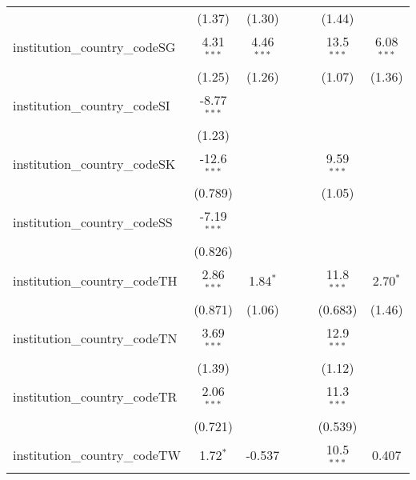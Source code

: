\begin{tabular}{lcccccc}
                                         & (1.37)         & (1.30)        &               &            & (1.44)        &   \\   
   institution\_country\_codeSG          & 4.31$^{***}$   & 4.46$^{***}$  &               &            & 13.5$^{***}$  & 6.08$^{***}$\\   
                                         & (1.25)         & (1.26)        &               &            & (1.07)        & (1.36)\\   
   institution\_country\_codeSI          & -8.77$^{***}$  &               &               &            &               &   \\   
                                         & (1.23)         &               &               &            &               &   \\   
   institution\_country\_codeSK          & -12.6$^{***}$  &               &               &            & 9.59$^{***}$  &   \\   
                                         & (0.789)        &               &               &            & (1.05)        &   \\   
   institution\_country\_codeSS          & -7.19$^{***}$  &               &               &            &               &   \\   
                                         & (0.826)        &               &               &            &               &   \\   
   institution\_country\_codeTH          & 2.86$^{***}$   & 1.84$^{*}$    &               &            & 11.8$^{***}$  & 2.70$^{*}$\\   
                                         & (0.871)        & (1.06)        &               &            & (0.683)       & (1.46)\\   
   institution\_country\_codeTN          & 3.69$^{***}$   &               &               &            & 12.9$^{***}$  &   \\   
                                         & (1.39)         &               &               &            & (1.12)        &   \\   
   institution\_country\_codeTR          & 2.06$^{***}$   &               &               &            & 11.3$^{***}$  &   \\   
                                         & (0.721)        &               &               &            & (0.539)       &   \\   
   institution\_country\_codeTW          & 1.72$^{*}$     & -0.537        &               &            & 10.5$^{***}$  & 0.407\\   

\end{tabular}
